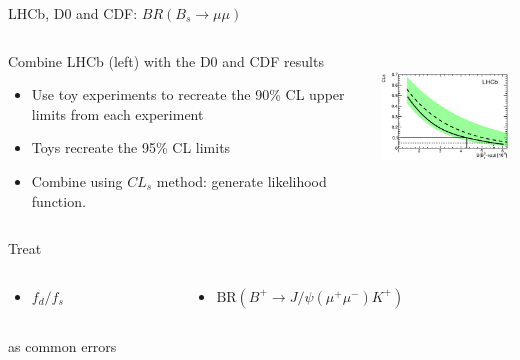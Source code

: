 \documentclass{beamer}
\begin{document}
\begin{frame}{LHCb, D0 and CDF: $BR(B_{s}\rightarrow\mu\mu)$}
  \begin{columns}
    \begin{column}{0.5\textwidth}
      Combine LHCb (left) with the D0 and CDF
      results
      \begin{itemize}
        \item Use toy experiments to recreate the 90\% CL upper limits from each
        experiment
        \item Toys recreate the 95\% CL limits
        \item Combine using $CL_{s}$ method: generate likelihood
        function.  
      \end{itemize}
    \end{column}
    \begin{column}{0.5\textwidth}
      \includegraphics[height=3.4cm]{lhcbBR.png}
    \end{column}
  \end{columns}
  \vfill
  Treat 
  \begin{columns}
    \begin{column}{0.15\textwidth}
      \begin{itemize}
        \item $f_{d}/f_{s}$ 
      \end{itemize}
     \end{column}
    \begin{column}{0.85\textwidth}
      \begin{itemize}
        \item $\textrm{BR}\left(B^{+}\rightarrow
        J/\psi\left(\mu^{+}\mu^{-}\right)K^{+}\right)$
      \end{itemize}
     \end{column}
  \end{columns}
  \vfill
  as common errors
\end{frame}
\end{document}
